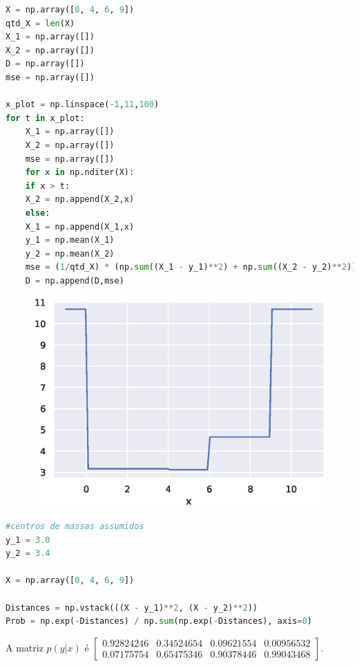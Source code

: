 \documentclass{homeworkclass}
\begin{document}
\begin{homeworkProblem}

\begin{homeworkSection}
\begin{lstlisting}[language=Python]
X = np.array([0, 4, 6, 9])
qtd_X = len(X)
X_1 = np.array([])
X_2 = np.array([])
D = np.array([])
mse = np.array([])

x_plot = np.linspace(-1,11,100)
for t in x_plot:
	X_1 = np.array([])
	X_2 = np.array([])
	mse = np.array([])
	for x in np.nditer(X):
	if x > t:
	X_2 = np.append(X_2,x)
	else:
	X_1 = np.append(X_1,x)
	y_1 = np.mean(X_1)
	y_2 = np.mean(X_2)
	mse = (1/qtd_X) * (np.sum((X_1 - y_1)**2) + np.sum((X_2 - y_2)**2))
	D = np.append(D,mse)
\end{lstlisting}

\begin{figure}[!h]
	\centering
	\includegraphics[width=0.7\linewidth]{figs/cos}
	\caption{}
	\label{fig:cos}
\end{figure}
\end{homeworkSection}


\pagebreak
\begin{homeworkSection}
\begin{lstlisting}[language=Python]
#centros de massas assumidos
y_1 = 3.0
y_2 = 3.4

X = np.array([0, 4, 6, 9])

Distances = np.vstack(((X - y_1)**2, (X - y_2)**2))
Prob = np.exp(-Distances) / np.sum(np.exp(-Distances), axis=0)
\end{lstlisting}
A matriz $p(y|x)$ é $\begin{bmatrix}
	0.92824246 & 0.34524654 & 0.09621554 & 0.00956532 \\ 
	0.07175754 & 0.65475346 & 0.90378446 & 0.99043468
\end{bmatrix} $.

\end{homeworkSection}




\end{homeworkProblem}
\end{document}
